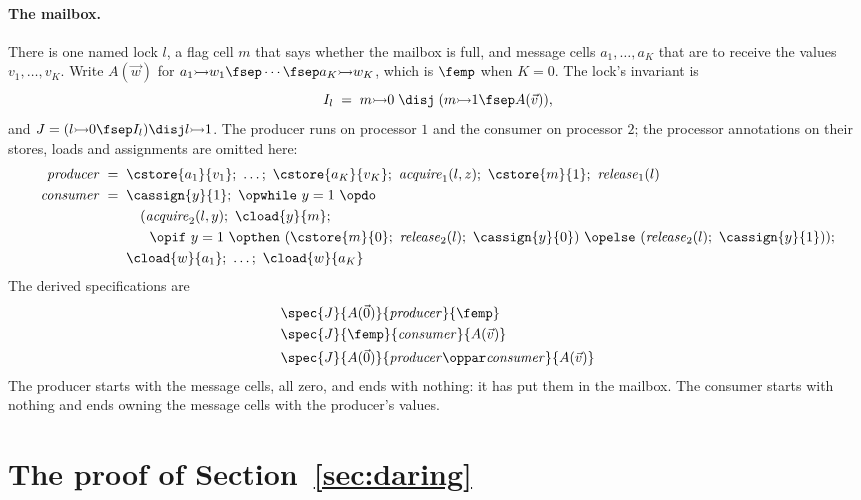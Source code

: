 \paragraph{The mailbox.}
There is one named lock $l$, a flag cell $m$ that says whether the mailbox
is full, and message cells $a_1,\dots,a_K$ that are to receive the values
$v_1,\dots,v_K$. Write $A(\vec{w})$ for
$a_1 \fcell w_1 \fsep \cdots \fsep a_K \fcell w_K$, which is $\femp$ when
$K = 0$. The lock's invariant is
\[
  I_l \;=\; m \fcell 0 \;\disj\; (m \fcell 1 \fsep A(\vec{v})),
\]
and $J = (l \fcell 0 \fsep I_l) \disj l \fcell 1$. The producer runs on
processor $1$ and the consumer on processor $2$; the processor
annotations on their stores, loads and assignments are omitted here:
\begin{align*}
\mathit{producer} \;=\;\;
 & \cstore{a_1}{v_1};\ \dots;\ \cstore{a_K}{v_K};\
   \mathit{acquire}_1(l,z);\ \cstore{m}{1};\ \mathit{release}_1(l) \\
\mathit{consumer} \;=\;\;
 & \cassign{y}{1};\ \opwhile\ y = 1\ \opdo \\
 & \quad (\mathit{acquire}_2(l,y);\ \cload{y}{m}; \\
 & \quad\ \ \opif\ y = 1\ \opthen\
     (\cstore{m}{0};\ \mathit{release}_2(l);\ \cassign{y}{0})\
     \opelse\ (\mathit{release}_2(l);\ \cassign{y}{1})); \\
 & \cload{w}{a_1};\ \dots;\ \cload{w}{a_K}
\end{align*}
The derived specifications are
\begin{align*}
 & \spec{J}{A(\vec{0})}{\mathit{producer}}{\femp} \\
 & \spec{J}{\femp}{\mathit{consumer}}{A(\vec{v})} \\
 & \spec{J}{A(\vec{0})}{\mathit{producer} \oppar \mathit{consumer}}
        {A(\vec{v})}
\end{align*}
The producer starts with the message
cells, all zero, and ends with nothing: it has put them in the mailbox. The
consumer starts with nothing and ends owning the message cells with the
producer's values.

\FloatBarrier
\section{The proof of Section~\ref{sec:daring}}
\label{app:dekker}


